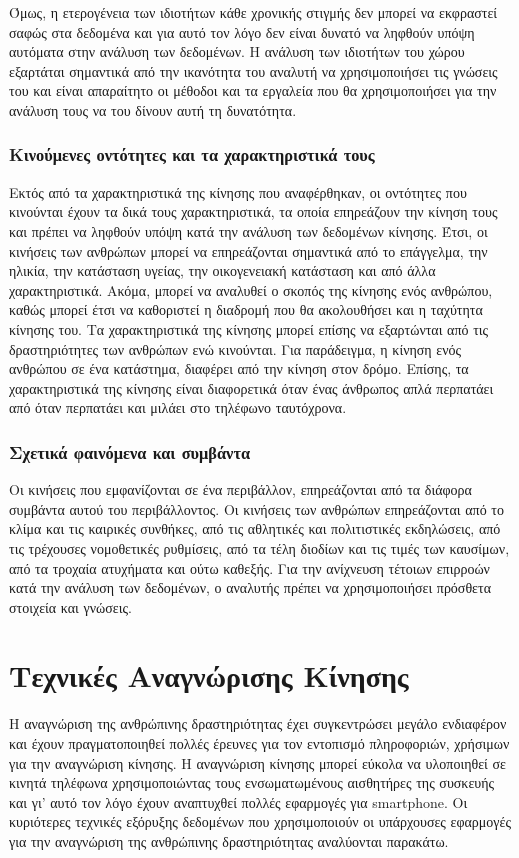 \documentclass[12pt,twoside,openright]{report}
\begin{document}
Όμως, η ετερογένεια των ιδιοτήτων κάθε χρονικής στιγμής δεν μπορεί να εκφραστεί σαφώς στα δεδομένα και για αυτό τον λόγο δεν είναι δυνατό να ληφθούν υπόψη αυτόματα στην ανάλυση των δεδομένων. Η ανάλυση των ιδιοτήτων του χώρου εξαρτάται σημαντικά από την ικανότητα του αναλυτή να χρησιμοποιήσει τις γνώσεις του και είναι απαραίτητο οι μέθοδοι και τα εργαλεία που θα χρησιμοποιήσει για την ανάλυση τους να του δίνουν αυτή τη δυνατότητα. 

\subsubsection*{Κινούμενες οντότητες και τα χαρακτηριστικά τους}
Εκτός από τα χαρακτηριστικά της κίνησης που αναφέρθηκαν, οι οντότητες που κινούνται έχουν τα δικά τους χαρακτηριστικά, τα οποία επηρεάζουν την κίνηση τους και πρέπει να ληφθούν υπόψη κατά την ανάλυση των δεδομένων κίνησης. Έτσι, οι κινήσεις των ανθρώπων μπορεί να επηρεάζονται σημαντικά από το επάγγελμα, την ηλικία, την κατάσταση υγείας, την οικογενειακή κατάσταση και από άλλα χαρακτηριστικά. Ακόμα, μπορεί να αναλυθεί ο σκοπός της κίνησης ενός ανθρώπου, καθώς μπορεί έτσι να καθοριστεί η διαδρομή που θα ακολουθήσει και η ταχύτητα κίνησης του. Τα χαρακτηριστικά της κίνησης μπορεί επίσης να εξαρτώνται από τις δραστηριότητες των ανθρώπων ενώ κινούνται. Για παράδειγμα, η κίνηση ενός ανθρώπου σε ένα κατάστημα, διαφέρει από την κίνηση στον δρόμο. Επίσης, τα χαρακτηριστικά της κίνησης είναι διαφορετικά όταν ένας άνθρωπος απλά περπατάει από όταν περπατάει και μιλάει στο τηλέφωνο ταυτόχρονα.

\subsubsection*{Σχετικά φαινόμενα και συμβάντα}
Οι κινήσεις που εμφανίζονται σε ένα περιβάλλον, επηρεάζονται από τα διάφορα συμβάντα αυτού του περιβάλλοντος. Οι κινήσεις των ανθρώπων επηρεάζονται από το κλίμα και τις καιρικές συνθήκες, από τις αθλητικές και πολιτιστικές εκδηλώσεις, από τις τρέχουσες νομοθετικές ρυθμίσεις, από τα τέλη διοδίων και τις τιμές των καυσίμων, από τα τροχαία ατυχήματα και ούτω καθεξής. Για την ανίχνευση τέτοιων επιρροών κατά την ανάλυση των δεδομένων, ο αναλυτής πρέπει να χρησιμοποιήσει πρόσθετα στοιχεία και γνώσεις.
\section[Τεχνικές Αναγνώρισης Κίνησης]{Τεχνικές Αναγνώρισης Κίνησης}
Η αναγνώριση της ανθρώπινης δραστηριότητας έχει συγκεντρώσει μεγάλο ενδιαφέρον και έχουν πραγματοποιηθεί πολλές έρευνες για τον εντοπισμό πληροφοριών, χρήσιμων για την αναγνώριση κίνησης. Η αναγνώριση κίνησης μπορεί εύκολα να υλοποιηθεί σε κινητά τηλέφωνα χρησιμοποιώντας τους ενσωματωμένους αισθητήρες της συσκευής και γι’ αυτό τον λόγο έχουν αναπτυχθεί πολλές εφαρμογές για \lt smartphone. \gt Οι κυριότερες τεχνικές εξόρυξης δεδομένων που χρησιμοποιούν οι υπάρχουσες εφαρμογές για την αναγνώριση της ανθρώπινης δραστηριότητας αναλύονται παρακάτω.
\end{document}
